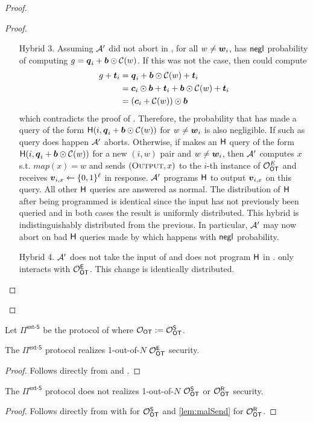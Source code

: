 \begin{proof}
\begin{proof}
\begin{enumerate}[leftmargin=1.8cm]
			\item[Hybrid 3.]\label{hybrid:simOutput} Assuming $\mathcal{A}'$ did not abort in , for all $w\neq \boldsymbol{w}_i$, \rec has $\mathsf{negl}$ probability of computing $g=\boldsymbol{q}_i+\boldsymbol{b}\odot \mathcal{C}(w)$. If this was not the case, then \rec could compute
			\begin{align*}
			g +\boldsymbol{t}_i &=\boldsymbol{q}_i+\boldsymbol{b}\odot \mathcal{C}(w)+\boldsymbol{t}_i\\
			&=\boldsymbol{c}_i\odot\boldsymbol{b}+\boldsymbol{t}_i+\boldsymbol{b}\odot \mathcal{C}(w)+\boldsymbol{t}_i\\
			&=(\boldsymbol{c}_i+\mathcal{C}(w))\odot \boldsymbol{b}
			\end{align*}
			which contradicts the proof of .
			Therefore, the probability that \Adv has made a query of the form $\mathsf{H}(i,\boldsymbol{q}_i+\boldsymbol{b}\odot \mathcal{C}(w))$ for $w\neq \boldsymbol{w}_i$ is also negligible. If such as query does happen $\mathcal{A}'$ aborts. Otherwise, if \send makes an $\mathsf{H}$ query of the form $\mathsf{H}(i,\boldsymbol{q}_i+\boldsymbol{b}\odot \mathcal{C}(w))$ for a new $(i,w)$ pair and $w\neq \boldsymbol{w}_i$, then $\mathcal{A}'$ computes $x$ s.t. $map(x)=w$ and sends $(\textsc{Output}, x)$ to the $i$-th instance of $\mathcal{O}_{\mathsf{OT}}^E$ and receives $\boldsymbol{v}_{i,x}\gets\{0,1\}^\ell$ in response. $\mathcal{A}'$ programs $\mathsf{H}$ to output $\boldsymbol{v}_{i,x}$ on this query. All other $\mathsf{H}$ queries are answered as normal. The distribution of $\mathsf{H}$ after being programmed is identical since the input has not previously been queried and in both cases the result is uniformly distributed. This hybrid is indistinguishably distributed from the previous. In particular, $\mathcal{A}'$ may now abort on bad $\mathsf{H}$ queries made by \rec which happens with $\mathsf{negl}$ probability.
			
			\item[Hybrid 4.] $\mathcal{A}'$ does not take the input of \send and does not program $\mathsf{H}$ in . \send only interacts with $\mathcal{O}_{\mathsf{OT}}^\mathsf{E}$. This change is identically distributed.
		\end{enumerate}
	\end{proof}
\end{proof}



\begin{definition}\label{def:ext_S_U}
	Let $\Pi^{\textsf{ext-S}}$ be the protocol of  where $\mathcal{O}_{\mathsf{OT}}:=\mathcal{O}_{\mathsf{OT}}^\mathsf{S}$.
\end{definition}
\begin{lemma}
	The $\Pi^\textsf{ext-S}$ protocol realizes 1-out-of-$N$ $\mathcal{O}_{\mathsf{OT}}^\mathsf{E}$ security.
\end{lemma}
\begin{proof}
	Follows directly from  and .
\end{proof}
\begin{lemma}
		The $\Pi^\textsf{ext-S}$ protocol does not realizes 1-out-of-$N$ $\mathcal{O}_{\mathsf{OT}}^\mathsf{S}$ or $\mathcal{O}_{\mathsf{OT}}^\mathsf{R}$ security.
\end{lemma}
\begin{proof}
	Follows directly from  with  for $\mathcal{O}_{\mathsf{OT}}^\mathsf{S}$ and \ref{lem:malSend} for $\mathcal{O}_{\mathsf{OT}}^\mathsf{R}$.
\end{proof}



